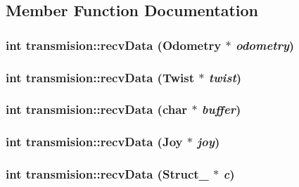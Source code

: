 \subsection{Member Function Documentation}
\hypertarget{classtransmision_ad1079ca1013063468528715ded83851e}{
\subsubsection[{recvData}]{\setlength{\rightskip}{0pt plus 5cm}int transmision::recvData ({\bf Odometry} $\ast$ {\em odometry})}}
\label{classtransmision_ad1079ca1013063468528715ded83851e}
\hypertarget{classtransmision_a89c0adf9833c7d42be1fcd1c7dc978e0}{
\subsubsection[{recvData}]{\setlength{\rightskip}{0pt plus 5cm}int transmision::recvData ({\bf Twist} $\ast$ {\em twist})}}
\label{classtransmision_a89c0adf9833c7d42be1fcd1c7dc978e0}
\hypertarget{classtransmision_a1af0251c8c9487dc6feff1075bb7bee2}{
\subsubsection[{recvData}]{\setlength{\rightskip}{0pt plus 5cm}int transmision::recvData (char $\ast$ {\em buffer})}}
\label{classtransmision_a1af0251c8c9487dc6feff1075bb7bee2}
\hypertarget{classtransmision_ab200238f23c207a2acdcbfa44facf5ba}{
\subsubsection[{recvData}]{\setlength{\rightskip}{0pt plus 5cm}int transmision::recvData ({\bf Joy} $\ast$ {\em joy})}}
\label{classtransmision_ab200238f23c207a2acdcbfa44facf5ba}
\hypertarget{classtransmision_a81218832d0a18422027503d1b529ac3c}{
\subsubsection[{recvData}]{\setlength{\rightskip}{0pt plus 5cm}int transmision::recvData ({\bf Struct\_} $\ast$ {\em c})}}

